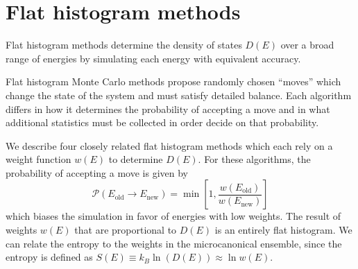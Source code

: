 \documentclass[letterpaper,twocolumn,amsmath,amssymb,pre,aps,10pt]{revtex4-1}
\newcommand{\blue}[1]{{\bf \color{blue} #1}}
\newcommand{\jpsays}[1]{{\color{red} [\blue{Jordan:} \emph{#1}]}}
\begin{document}
\section{Flat histogram methods}\label{sec:histogram}
Flat histogram methods determine the density of states $D(E)$ over a broad range
of energies by simulating each energy with equivalent accuracy.

Flat histogram Monte Carlo methods propose randomly chosen ``moves''
which change the state of the system and must satisfy detailed balance.  Each
algorithm differs in how it determines the probability of accepting a move and
in what additional statistics must be collected in order decide on that
probability.

We describe four closely related flat histogram methods which each rely on a
weight function $w(E)$ to determine $D(E)$.  For these algorithms, the
probability of accepting a move is given by
\begin{equation}
	\mathcal{P}(E_\text{old} \rightarrow E_\text{new})
	= \min\left[1,\frac{w(E_\text{old})}{w(E_\text{new})}\right]
\end{equation}
which biases the simulation in favor of energies with low weights. The result of
weights $w(E)$ that are proportional to $D(E)$ is an entirely flat histogram. We
can relate the entropy to the weights in the microcanonical ensemble, since the
entropy is defined as $S(E) \equiv k_B\ln(D(E)) \approx \ln w(E)$.
\end{document}
